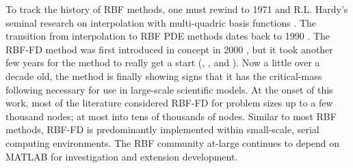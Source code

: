 \documentclass[11pt]{report}
\begin{document}




To track the history of RBF methods, one must rewind to 1971 and R.L. Hardy's seminal research on interpolation with multi-quadric basis functions \cite{Hardy1971}. The transition from interpolation to RBF PDE methods dates back to 1990 \cite{Kansa1990a,Kansa1990b}. 
The RBF-FD method was first introduced in concept in 2000 \cite{Tolstykh2000}, but it took another few years for the method to really get a start (\cite{Shu2003}, \cite{Tolstykh2003a}, \cite{Wright2003} and \cite{Cecil2004}). Now a little over a decade old, the method is finally showing signs that it has the critical-mass following necessary for use in large-scale scientific models. At the onset of this work, most of the literature considered RBF-FD for problem sizes up to a few thousand nodes; at most into tens of thousands of nodes. Similar to most RBF methods, RBF-FD is predominantly implemented within small-scale, serial computing environments. The RBF community at-large continues to depend on MATLAB for investigation and extension development.
\end{document}
